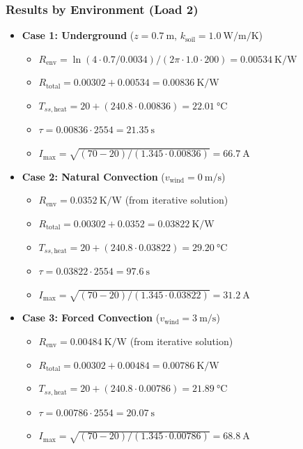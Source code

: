 \documentclass[11pt, a4paper]{article}
\begin{document}
\subsubsection{Results by Environment (Load 2)}
\begin{itemize}
    \item \textbf{Case 1: Underground} ($z=\SI{0.7}{\metre}$, $k_{\text{soil}}=\SI{1.0}{\watt\per\metre\per\kelvin}$)
        \begin{itemize}
            \item $R_{\text{env}} = \ln(4 \cdot 0.7 / 0.0034) / (2\pi \cdot 1.0 \cdot 200) = \SI{0.00534}{\kelvin\per\watt}$
            \item $R_{\text{total}} = 0.00302 + 0.00534 = \SI{0.00836}{\kelvin\per\watt}$
            \item $T_{ss,\text{heat}} = 20 + (240.8 \cdot 0.00836) = \SI{22.01}{\celsius}$
            \item $\tau = 0.00836 \cdot 2554 = \SI{21.35}{\second}$
            \item $I_{\text{max}} = \sqrt{(70-20) / (1.345 \cdot 0.00836)} = \SI{66.7}{\ampere}$
        \end{itemize}

    \item \textbf{Case 2: Natural Convection} ($v_{\text{wind}} = \SI{0}{\metre\per\second}$)
        \begin{itemize}
            \item $R_{\text{env}} = \SI{0.0352}{\kelvin\per\watt}$ (from iterative solution)
            \item $R_{\text{total}} = 0.00302 + 0.0352 = \SI{0.03822}{\kelvin\per\watt}$
            \item $T_{ss,\text{heat}} = 20 + (240.8 \cdot 0.03822) = \SI{29.20}{\celsius}$
            \item $\tau = 0.03822 \cdot 2554 = \SI{97.6}{\second}$
            \item $I_{\text{max}} = \sqrt{(70-20) / (1.345 \cdot 0.03822)} = \SI{31.2}{\ampere}$
        \end{itemize}

    \item \textbf{Case 3: Forced Convection} ($v_{\text{wind}} = \SI{3}{\metre\per\second}$)
        \begin{itemize}
            \item $R_{\text{env}} = \SI{0.00484}{\kelvin\per\watt}$ (from iterative solution)
            \item $R_{\text{total}} = 0.00302 + 0.00484 = \SI{0.00786}{\kelvin\per\watt}$
            \item $T_{ss,\text{heat}} = 20 + (240.8 \cdot 0.00786) = \SI{21.89}{\celsius}$
            \item $\tau = 0.00786 \cdot 2554 = \SI{20.07}{\second}$
            \item $I_{\text{max}} = \sqrt{(70-20) / (1.345 \cdot 0.00786)} = \SI{68.8}{\ampere}$
        \end{itemize}
\end{itemize}
\end{document}
